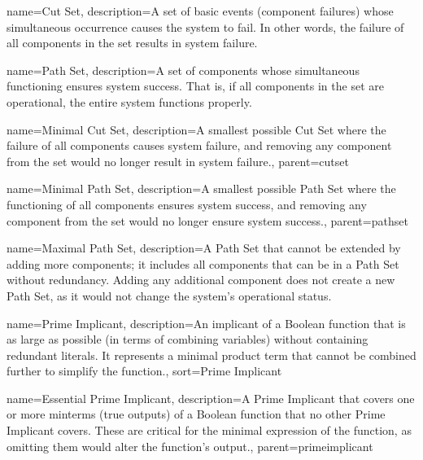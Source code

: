 \theoremstyle{definition}
\newtheorem{definition}{Definition}[section]


{
    name=Cut Set,
    description={A set of basic events (component failures) whose simultaneous occurrence causes the system to fail. In other words, the failure of all components in the set results in system failure.}
}

{
    name=Path Set,
    description={A set of components whose simultaneous functioning ensures system success. That is, if all components in the set are operational, the entire system functions properly.}
}


{
    name=Minimal Cut Set,
    description={A smallest possible Cut Set where the failure of all components causes system failure, and removing any component from the set would no longer result in system failure.},
    parent=cutset
}


{
    name=Minimal Path Set,
    description={A smallest possible Path Set where the functioning of all components ensures system success, and removing any component from the set would no longer ensure system success.},
    parent=pathset
}

{
    name=Maximal Path Set,
    description={A Path Set that cannot be extended by adding more components; it includes all components that can be in a Path Set without redundancy. Adding any additional component does not create a new Path Set, as it would not change the system's operational status.}
}


{
    name=Prime Implicant,
    description={An implicant of a Boolean function that is as large as possible (in terms of combining variables) without containing redundant literals. It represents a minimal product term that cannot be combined further to simplify the function.},
    sort=Prime Implicant
}


{
    name=Essential Prime Implicant,
    description={A Prime Implicant that covers one or more minterms (true outputs) of a Boolean function that no other Prime Implicant covers. These are critical for the minimal expression of the function, as omitting them would alter the function's output.},
    parent=primeimplicant
}

